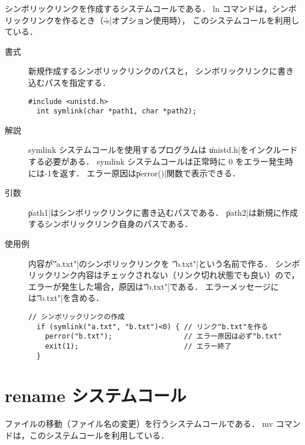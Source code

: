 シンボリックリンクを作成するシステムコールである．
ln コマンドは，シンボリックリンクを作るとき（\|-s|オプション使用時），
このシステムコールを利用している．

\begin{description}
\item[書式] 新規作成するシンボリックリンクのパスと，
シンボリックリンクに書き込むパスを指定する．
\begin{lstlisting}[numbers=none]
  #include <unistd.h>
  int symlink(char *path1, char *path2);
\end{lstlisting}

\item[解説] symlink システムコールを使用するプログラムは
\|unistd.h|をインクルードする必要がある．
symlink システムコールは正常時に 0 をエラー発生時には-1を返す．
エラー原因は\|perror()|関数で表示できる．

\item[引数] \|path1|はシンボリックリンクに書き込むパスである．
\|path2|は新規に作成するシンボリックリンク自身のパスである．

\item[使用例] 内容が\|"a.txt"|のシンボリックリンクを
\|"b.txt"|という名前で作る．
シンボリックリンク内容はチェックされない（リンク切れ状態でも良い）ので，
エラーが発生した場合，原因は\|"b.txt"|である．
エラーメッセージには\|"b.txt"|を含める．
\begin{lstlisting}[numbers=none]
  // シンボリックリンクの作成
  if (symlink("a.txt", "b.txt")<0) { // リンク"b.txt"を作る
    perror("b.txt");                 // エラー原因は必ず"b.txt"
    exit(1);                         // エラー終了
  }
\end{lstlisting}
\end{description}

\section{rename システムコール}
ファイルの移動（ファイル名の変更）を行うシステムコールである．
mv コマンドは，このシステムコールを利用している．

